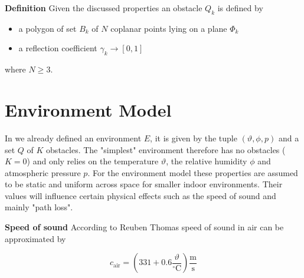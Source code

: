 \textbf{Definition}\newline
Given the discussed properties an obstacle $Q_k$ is defined by
\begin{itemize}
    \item a polygon of set $B_k$ of $N$ coplanar points lying on a plane $\Phi_k$
    \item a reflection coefficient $\gamma_k \rightarrow [0,1]$
\end{itemize}
where $N \geq 3$.

\section{Environment Model}\label{sec:environment}
In  we already defined an environment $E$, it is given by the tuple $(\vartheta, \phi, p)$ and a set $Q$ of $K$ obstacles.
The "simplest" environment therefore has no obstacles ($K=0$) and only relies on the temperature $\vartheta$, the relative humidity $\phi$ and atmospheric pressure $p$.
For the environment model these properties are assumed to be static and uniform across space for smaller indoor environments.
Their values will influence certain physical effects such as the speed of sound and mainly "path loss".

\textbf{Speed of sound}\newline
According to Reuben Thomas \cite{wayverb} speed of sound in air can be approximated by

\begin{equation}
    c_{\text{air}} = (331 + 0.6 \frac{\vartheta}{^{\circ}\textrm{C}})\frac{\text{m}}{\text{s}}
\end{equation}

